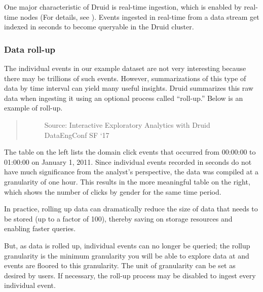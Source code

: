 \documentclass[letterpaper,10pt,english]{sphinxmanual}
\begin{document}
One major characteristic of Druid is real-time ingestion, which is enabled by real-time nodes (For details, see {\hyperref[\detokenize{discovery/part01/druid_nodes:realtime-nodes}]{}}). Events ingested in real-time from a data stream get indexed in seconds to become queryable in the Druid cluster.


\subsubsection{Data roll-up}
\label{\detokenize{discovery/part01/druid_features:roll-up}}\label{\detokenize{discovery/part01/druid_features:data-rollup}}
The individual events in our example dataset are not very interesting because there may be trillions of such events. However, summarizations of this type of data by time interval can yield many useful insights. Druid summarizes this raw data when ingesting it using an optional process called “roll-up.” Below is an example of roll-up.
\begin{quote}

\begin{figure}[H]
\centering
\capstart

\noindent{}
\caption{Source: Interactive Exploratory Analytics with Druid \textbar{} DataEngConf SF ‘17}\label{\detokenize{discovery/part01/druid_features:id7}}\end{figure}
\end{quote}

The table on the left lists the domain click events that occurred from 00:00:00 to 01:00:00 on January 1, 2011. Since individual events recorded in seconds do not have much significance from the analyst’s perspective, the data was compiled at a granularity of one hour. This results in the more meaningful table on the right, which shows the number of clicks by gender for the same time period.

In practice, rolling up data can dramatically reduce the size of data that needs to be stored (up to a factor of 100), thereby saving on storage resources and enabling faster queries.

But, as data is rolled up, individual events can no longer be queried; the rollup granularity is the minimum granularity you will be able to explore data at and events are floored to this granularity. The unit of granularity can be set as desired by users. If necessary, the roll-up process may be disabled to ingest every individual event.
\end{document}
